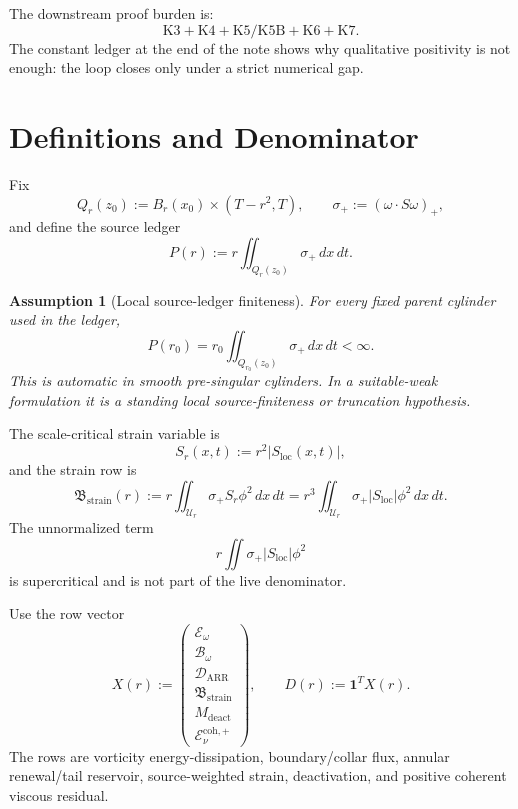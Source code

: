 \documentclass[11pt]{article}
\newtheorem{assumption}{Assumption}
\begin{document}
The downstream proof burden is:
\[
\text{K3}+\text{K4}+\text{K5/K5B}+\text{K6}+\text{K7}.
\]
The constant ledger at the end of the note shows why qualitative positivity is
not enough: the loop closes only under a strict numerical gap.

\clearpage
\section{Definitions and Denominator}
\label{sec:definitions}

Fix
\[
Q_r(z_0):=B_r(x_0)\times(T-r^2,T),
\qquad
\sigma_+:=(\omega\cdot S\omega)_+,
\]
and define the source ledger
\begin{equation}
\label{eq:P-def}
P(r):=r\iint_{Q_r(z_0)}\sigma_+\,dx\,dt .
\end{equation}

\begin{assumption}[Local source-ledger finiteness]
\label{ass:source-finite}
For every fixed parent cylinder used in the ledger,
\[
P(r_0)=r_0\iint_{Q_{r_0}(z_0)}\sigma_+\,dx\,dt<\infty.
\]
This is automatic in smooth pre-singular cylinders.  In a suitable-weak
formulation it is a standing local source-finiteness or truncation hypothesis.
\end{assumption}

The scale-critical strain variable is
\[
S_r(x,t):=r^2|S_{\mathrm{loc}}(x,t)|,
\]
and the strain row is
\begin{equation}
\label{eq:strain-row}
\mathfrak B_{\mathrm{strain}}(r)
:=
r\iint_{\mathcal U_r}\sigma_+ S_r\phi^2\,dx\,dt
=
r^3\iint_{\mathcal U_r}\sigma_+|S_{\mathrm{loc}}|\phi^2\,dx\,dt .
\end{equation}
The unnormalized term
\[
r\iint\sigma_+|S_{\mathrm{loc}}|\phi^2
\]
is supercritical and is not part of the live denominator.

Use the row vector
\begin{equation}
\label{eq:X-def}
X(r):=
\begin{pmatrix}
\mathcal E_\omega\\
\mathcal B_\omega\\
\mathcal D_{\mathrm{ARR}}\\
\mathfrak B_{\mathrm{strain}}\\
M_{\mathrm{deact}}\\
\mathcal E_\nu^{\mathrm{coh},+}
\end{pmatrix},
\qquad
D(r):=\mathbf 1^T X(r).
\end{equation}
The rows are vorticity energy-dissipation, boundary/collar flux, annular
renewal/tail reservoir, source-weighted strain, deactivation, and positive
coherent viscous residual.
\end{document}

